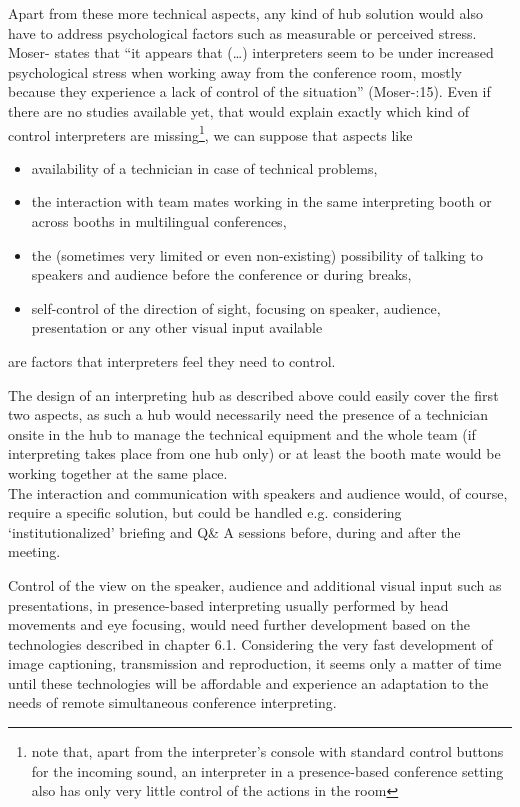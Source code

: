 \documentclass[output=paper]{langsci/langscibook}
\begin{document}
Apart from these more technical aspects, any kind of hub solution would also have to address psychological factors such as measurable or perceived stress. Moser-\citet{Mercer2005} states that “it appears that (…) interpreters seem to be under increased psychological stress when working away from the conference room, mostly because they experience a lack of control of the situation” (Moser-\citealt{Mercer2005}:15). Even if there are no studies available yet, that would explain exactly which kind of control interpreters are missing\footnote{note that, apart from the interpreter’s console with standard control buttons for the incoming sound, an interpreter in a presence-based conference setting also has only very little control of the actions in the room}, we can suppose that aspects like

\begin{itemize}
\item availability of a technician in case of technical problems,
\item the interaction with team mates working in the same interpreting booth or across booths in multilingual conferences,
\item the (sometimes very limited or even non-existing) possibility of talking to speakers and audience before the conference or during breaks,
\item self-control of the direction of sight, focusing on speaker, audience, presentation or any other visual input available
\end{itemize}

are factors that interpreters feel they need to control.

The design of an interpreting hub as described above could easily cover the first two aspects, as such a hub would necessarily need the presence of a technician onsite in the hub to manage the technical equipment and the whole team (if interpreting takes place from one hub only) or at least the booth mate would be working together at the same place. \\
The interaction and communication with speakers and audience would, of course, require a specific solution, but could be handled e.g. considering ‘institutionalized’ briefing and Q\& A sessions before, during and after the meeting.

Control of the view on the speaker, audience and additional visual input such as presentations, in presence-based interpreting usually performed by head movements and eye focusing, would need further development based on the technologies described in chapter 6.1. Considering the very fast development of image captioning, transmission and reproduction, it seems only a matter of time until these technologies will be affordable and experience an adaptation to the needs of remote simultaneous conference interpreting. 
\end{document}
